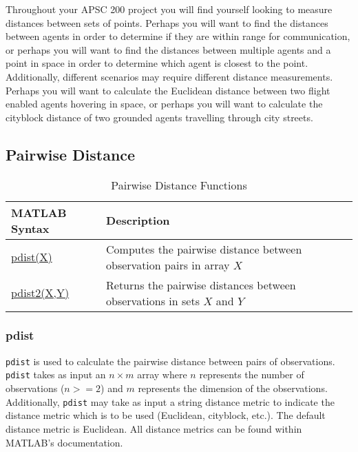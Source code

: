 \documentclass[../MATLAB_Primer.tex]{subfiles}
\begin{document}
Throughout your APSC 200 project you will find yourself looking to measure distances between sets of points. Perhaps you will want to find the distances between agents in order to determine if they are within range for communication, or perhaps you will want to find the distances between multiple agents and a point in space in order to determine which agent is closest to the point. Additionally, different scenarios may require different distance measurements. Perhaps you will want to calculate the Euclidean distance between two flight enabled agents hovering in space, or perhaps you will want to calculate the cityblock distance of two grounded agents travelling through city streets.

\subsection{Pairwise Distance}

\begin{table}[H]
\caption{Pairwise Distance Functions}
    \begin{center}
        \begin{tabular}{| C{3cm} | m{12cm}|}
            \hline
            \textbf{MATLAB Syntax} & \textbf{Description}\\
            
            \hline
            \href{https://www.mathworks.com/help/stats/pdist.html}{\color{blue}pdist(X)} & Computes the pairwise distance between observation pairs in array $X$\\
            \hline
            \href{https://www.mathworks.com/help/stats/pdist2.html}{\color{blue}pdist2(X,Y)} & Returns the pairwise distances between observations in sets $X$ and $Y$\\
            \hline
        \end{tabular}
        \label{tab:pairwise_distance}
    \end{center}
\end{table}

\subsubsection{pdist}
\texttt{pdist} is used to calculate the pairwise distance between pairs of observations. \texttt{pdist} takes as input an $n\times m$ array where $n$ represents the number of observations ($n>=2$) and $m$ represents the dimension of the observations. Additionally, \texttt{pdist} may take as input a string distance metric to indicate the distance metric which is to be used (Euclidean, cityblock, etc.). The default distance metric is Euclidean. All distance metrics can be found within MATLAB's documentation.\\
\end{document}
